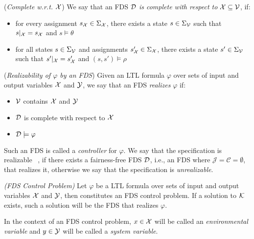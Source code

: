 \begin{definition}
	\label{def:complete_fds} (\emph{Complete w.r.t.} ${\mathcal{X}}$)
	We say that an FDS $\mathcal{D}$ \emph{is complete with respect to} ${\mathcal{X}} \subseteq {\mathcal{V}}$, if:
	\begin{itemize}
		\item for every assignment $s_{{\mathcal{X}}} \in \Sigma_{{\mathcal{X}}}$, there exists a state $s \in \Sigma_{{\mathcal{V}}}$ such that $s|_{{\mathcal{X}}} = s_{{\mathcal{X}}}$ and $s \models \theta$
		\item for all states $s \in \Sigma_{{\mathcal{V}}}$ and assignments $s'_{{\mathcal{X}}} \in \Sigma_{{\mathcal{X}}}$, there exists a state $s' \in \Sigma_{{\mathcal{V}}}$ such that $s'|_{{\mathcal{X}}}=s'_{{\mathcal{X}}}$ and $(s,s') \models \rho$
	\end{itemize}
\end{definition}


\begin{definition}
	\label{def:fds_realizability} (\emph{Realizability of $\varphi$ by an FDS})
	Given an LTL formula $\varphi$ over sets of input and output variables ${\mathcal{X}}$ and ${\mathcal{Y}}$, we say that an FDS \fdsDef \emph{realizes} $\varphi$ if:
	\begin{itemize}
		\item ${\mathcal{V}}$ contains ${\mathcal{X}}$ and ${\mathcal{Y}}$ 
		\item $\mathcal{D}$ is complete with respect to ${\mathcal{X}}$
		\item $\mathcal{D} \models \varphi$
	\end{itemize}
	Such an FDS is called a \emph{controller} for $\varphi$. We say that the specification is realizable ~\cite{pnueli1989synthesis}, if there exists a fairness-free FDS $\mathcal{D}$, i.e., an FDS where $\mathcal{J} =\mathcal{C} = \emptyset$, that realizes it, otherwise we say that the specification is \emph{unrealizable}.
\end{definition}

\begin{definition}
	\label{def:fds_control_problem} \emph{(FDS Control Problem)} 
	Let $\varphi$ be a LTL formula over sets of input and output variables ${\mathcal{X}}$ and ${\mathcal{Y}}$, then \fdsControlProblemDef constitutes an FDS control problem. If a solution to ${\mathcal{K}}$ exists, such a solution will be the FDS \fdsDef that realizes $\varphi$.
\end{definition}
In the context of an FDS control problem, $x \in {\mathcal{X}}$ will be called an \emph{environmental variable} and $y \in {\mathcal{Y}}$ will be called a \emph{system variable}.